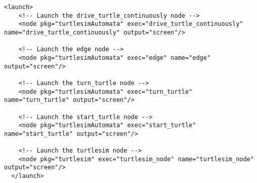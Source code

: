 \lstset{style=xmlstyle}

\begin{lstlisting}[caption={turtlesimAutomata\_launch.xml}, label={lst:launchfile}]
    <launch>
    <!-- Launch the drive_turtle_continuously node -->
    <node pkg="turtlesimAutomata" exec="drive_turtle_continuously" name="drive_turtle_continuously" output="screen"/>
    
    <!-- Launch the edge node -->
    <node pkg="turtlesimAutomata" exec="edge" name="edge" output="screen"/>
    
    <!-- Launch the turn_turtle node -->
    <node pkg="turtlesimAutomata" exec="turn_turtle" name="turn_turtle" output="screen"/>
  
    <!-- Launch the start_turtle node -->
    <node pkg="turtlesimAutomata" exec="start_turtle" name="start_turtle" output="screen"/>
  
    <!-- Launch the turtlesim node -->
    <node pkg="turtlesim" exec="turtlesim_node" name="turtlesim_node" output="screen"/>
  </launch>
\end{lstlisting}


